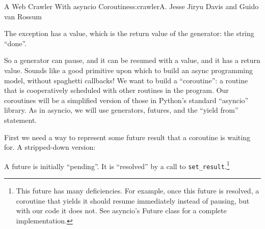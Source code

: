\begin{aosachapter}{A Web Crawler With asyncio Coroutines}{s:crawler}{A. Jesse Jiryu Davis and Guido van Rossum}
\begin{Shaded}
\begin{Highlighting}[]
\NormalTok{)}
\end{Highlighting}
\end{Shaded}

The exception has a value, which is the return value of the generator:
the string ``done''.

\label{building-coroutines-with-generators}

So a generator can pause, and it can be resumed with a value, and it has
a return value. Sounds like a good primitive upon which to build an
async programming model, without spaghetti callbacks! We want to build a
``coroutine'': a routine that is cooperatively scheduled with other
routines in the program. Our coroutines will be a simplified version of
those in Python's standard ``asyncio'' library. As in asyncio, we will
use generators, futures, and the ``yield from'' statement.

First we need a way to represent some future result that a coroutine is
waiting for. A stripped-down version:

\begin{Shaded}
\begin{Highlighting}[]
 
     \NormalTok{(}\NormalTok{):}

     

     
         
            \NormalTok{)}
\end{Highlighting}
\end{Shaded}

A future is initially ``pending''. It is ``resolved'' by a call to
\texttt{set\_result}.\footnote{This future has many deficiencies. For
  example, once this future is resolved, a coroutine that yields it
  should resume immediately instead of pausing, but with our code it
  does not. See asyncio's Future class for a complete implementation.}


\end{aosachapter}

